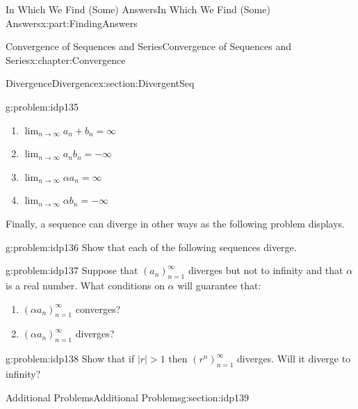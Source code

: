 \documentclass[oneside,10pt,]{book}
\numberwithin{equation}{section}
\newcommand{\abs}[1]{\left|#1\right|}
\def\limit#1#2#3{{\displaystyle\lim_{#1\rightarrow #2}#3}}
\newcommand{\NN}{\mathbb {N}}
\newcommand{\amp}{&}
\begin{document}
\begin{partptx}{In Which We Find (Some) Answers}{}{In Which We Find (Some) Answers}{}{}{x:part:FindingAnswers}
\begin{chapterptx}{Convergence of Sequences and Series}{}{Convergence of Sequences and Series}{}{}{x:chapter:Convergence}
\begin{sectionptx}{Divergence}{}{Divergence}{}{}{x:section:DivergentSeq}
\begin{problem}{}{g:problem:idp135}
\begin{enumerate}[font=\bfseries,label=(\alph*),ref=\alph*]
\item{}\(\limit{n}{\infty}{a_n+b_n}=\infty\)%
\item{}\(\limit{n}{\infty}{a_nb_n}=-\infty\)%
\item{}\(\limit{n}{\infty}{\alpha a_n}=\infty\)%
\item{}\(\limit{n}{\infty}{\alpha b_n}=-\infty\)%
\end{enumerate}
\end{problem}
Finally, a sequence can diverge in other ways as the following problem displays.%
\begin{problem}{}{g:problem:idp136}%
Show that each of the following sequences diverge.%
\end{problem}
\begin{problem}{}{g:problem:idp137}%
Suppose that \(\left(a_n\right)_{n=1}^\infty\) diverges but not to infinity and that \(\alpha\) is a real number. What conditions on \(\alpha\) will guarantee that:%
\begin{enumerate}[font=\bfseries,label=(\alph*),ref=\alph*]
\item{}\(\left(\alpha a_n\right)_{n=1}^\infty\) converges?%
\item{}\(\left(\alpha a_n\right)_{n=1}^\infty\) diverges?%
\end{enumerate}
\end{problem}
\begin{problem}{}{g:problem:idp138}%
Show that if \(\abs{r}>1\) then \(\left(r^n\right)_{n=1}^\infty\) diverges. Will it diverge to infinity?%
\end{problem}
\end{sectionptx}
%
%
\typeout{************************************************}
\typeout{************************************************}
%
\begin{sectionptx}{Additional Problems}{}{Additional Problems}{}{}{g:section:idp139}

\end{sectionptx}
\end{chapterptx}
\end{partptx}
\end{document}
